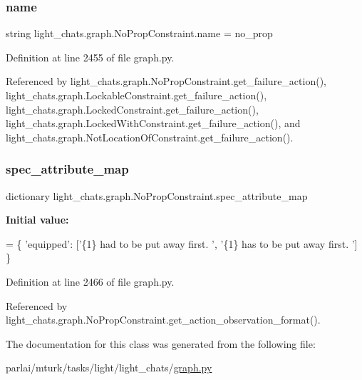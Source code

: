 \subsubsection{\texorpdfstring{name}{name}}
{\footnotesize\ttfamily string light\+\_\+chats.\+graph.\+No\+Prop\+Constraint.\+name = \textquotesingle{}no\+\_\+prop\textquotesingle{}\hspace{0.3cm}{\ttfamily [static]}}



Definition at line 2455 of file graph.\+py.



Referenced by light\+\_\+chats.\+graph.\+No\+Prop\+Constraint.\+get\+\_\+failure\+\_\+action(), light\+\_\+chats.\+graph.\+Lockable\+Constraint.\+get\+\_\+failure\+\_\+action(), light\+\_\+chats.\+graph.\+Locked\+Constraint.\+get\+\_\+failure\+\_\+action(), light\+\_\+chats.\+graph.\+Locked\+With\+Constraint.\+get\+\_\+failure\+\_\+action(), and light\+\_\+chats.\+graph.\+Not\+Location\+Of\+Constraint.\+get\+\_\+failure\+\_\+action().

\mbox{\label{classlight__chats_1_1graph_1_1NoPropConstraint_a522735936f15f8478d82d594802c99d4}} 
\subsubsection{\texorpdfstring{spec\+\_\+attribute\+\_\+map}{spec\_attribute\_map}}
{\footnotesize\ttfamily dictionary light\+\_\+chats.\+graph.\+No\+Prop\+Constraint.\+spec\+\_\+attribute\+\_\+map\hspace{0.3cm}{\ttfamily [static]}}

{\bfseries Initial value\+:}
\begin{DoxyCode}
=  \{
        \textcolor{stringliteral}{'equipped'}: [\textcolor{stringliteral}{'\{1\} had to be put away first. '}, \textcolor{stringliteral}{'\{1\} has to be put away first. '}]
    \}
\end{DoxyCode}


Definition at line 2466 of file graph.\+py.



Referenced by light\+\_\+chats.\+graph.\+No\+Prop\+Constraint.\+get\+\_\+action\+\_\+observation\+\_\+format().



The documentation for this class was generated from the following file\+:\begin{DoxyCompactItemize}
\item 
parlai/mturk/tasks/light/light\+\_\+chats/\hyperlink{parlai_2mturk_2tasks_2light_2light__chats_2graph_8py}{graph.\+py}\end{DoxyCompactItemize}
